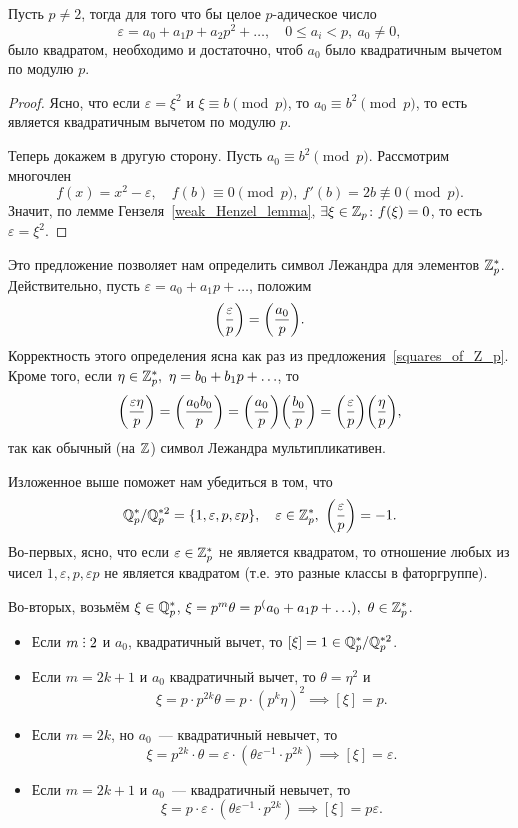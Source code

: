 	\begin{statement}\label{squares_of_Z_p} 
		Пусть $p \neq 2$, тогда для того что бы целое $p$-адическое число 
		\[
			\varepsilon = a_0 + a_1 p + a_2 p^2 + \ldots, \quad 0 \le a_i < p, \ a_0 \neq 0,
		\]
		было квадратом, необходимо и достаточно, чтоб $a_0$ было квадратичным вычетом по модулю $p$.
	\end{statement}
	\begin{proof}
		Ясно, что если $\varepsilon = \xi^2$ и $\xi \equiv b \pmod{p}$, то $a_0 \equiv b^2 \pmod{p}$, то есть является квадратичным вычетом по модулю $p$. 

		Теперь докажем в другую сторону. Пусть $a_0 \equiv b^2 \pmod{p}$. Рассмотрим многочлен 
		\[
			f(x) = x^2 - \varepsilon, \quad f(b) \equiv 0 \pmod{p}, \ f'(b) = 2b \not\equiv 0 \pmod{p}.
		\]
		Значит, по лемме Гензеля~\ref{weak_Henzel_lemma}, $\exists \xi \in \Z_{p}\colon f(\xi) = 0$, то есть $\varepsilon = \xi^2$.
	\end{proof}

	Это предложение позволяет нам определить символ Лежандра для элементов $\Z_{p}^{*}$. Действительно, пусть $\varepsilon = a_0 + a_1 p + \ldots$, положим 
	\[
		\lr*{\frac{\varepsilon}{p}} = \lr*{\frac{a_0}{p}}.
	\]
	Корректность этого определения ясна как раз из предложения~\ref{squares_of_Z_p}. Кроме того, если $\eta \in \Z_{p}^{*}, \ \eta = b_0 + b_1 p + \ldots$, то 
	\[
		\lr*{\frac{\varepsilon \eta}{p}} = \lr*{\frac{a_0 b_0}{p}} = \lr*{\frac{a_0}{p}}\lr*{\frac{b_0}{p}} = \lr*{\frac{\varepsilon}{p}}\lr*{\frac{\eta}{p}},
	\] 
	так как обычный (на $\Z$) символ Лежандра мультипликативен. 

	Изложенное выше поможет нам убедиться в том, что 
	\[
		\Q_{p}^{*}/\Q_{p}^{*2} = \{1, \varepsilon, p, \varepsilon p\}, \quad \varepsilon \in \Z_{p}^{*}, \  \lr*{\frac{\varepsilon}{p}} = -1. 
	\]
	Во-первых, ясно, что если $\varepsilon \in \Z_{p}^{*}$ не является квадратом, то отношение любых из чисел $1, \varepsilon, p, \varepsilon p$ не является квадратом (т.е. это разные классы в фаторгруппе).

	 Во-вторых, возьмём $\xi \in \Q_{p}^{*}$, $\xi = p^{m} \theta = p^(a_0 + a_1 p + \ldots), \ \theta \in \Z_{p}^{*}$. 
	\begin{itemize}
		\item Если $m \divby 2$ и $a_0$, квадратичный вычет, то $[\xi] = 1 \in \Q_{p}^{*}/\Q_{p}^{*2}$.
		\item Если $m = 2k + 1$ и $a_0$  квадратичный вычет, то $\theta = \eta^2$ и 
		\[
			\xi = p \cdot p^{2k}\theta = p \cdot (p^k \eta)^2 \implies [\xi] = p.
		\]
		\item Если $m = 2k$, но $a_0$~--- квадратичный невычет, то 
		\[
			\xi = p^{2k} \cdot \theta = \varepsilon \cdot (\theta \varepsilon^{-1} \cdot p^{2k}) \implies [\xi] = \varepsilon.
		\]
		\item Если $m = 2k + 1$ и $a_0$~--- квадратичный невычет, то 
		\[
			\xi = p \cdot \varepsilon \cdot (\theta \varepsilon^{-1} \cdot p^{2k}) \implies  [\xi] = p \varepsilon.
		\]
	\end{itemize}

